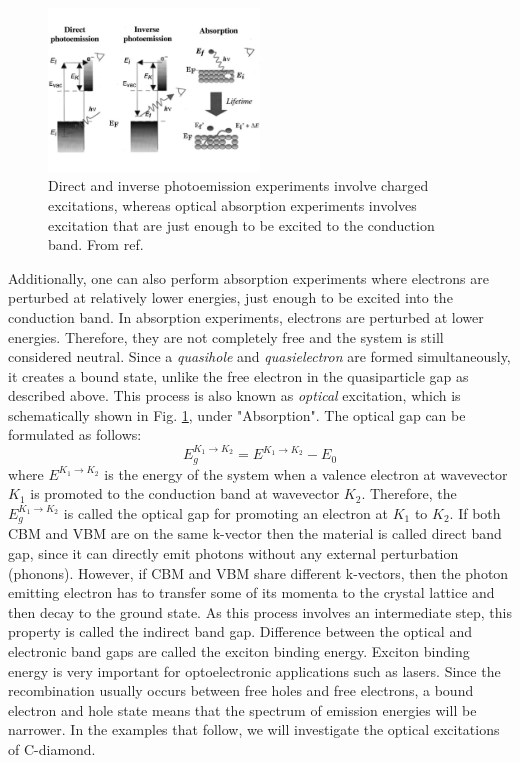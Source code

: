 \begin{figure}
	\centering
	\includegraphics[width=0.5\textwidth]{./figures/lab_excited_experiments}
	\caption{Direct and inverse photoemission experiments involve charged excitations, whereas optical absorption experiments involves excitation that are just enough to be excited to the conduction band. From ref. \cite{Onida2002a}}
	\label{fig:lab_ex_exp}
\end{figure}

Additionally, one can also perform absorption experiments where electrons are perturbed at relatively lower energies, just enough to be excited into the conduction band. 
In absorption experiments,  electrons are perturbed at lower energies. 
Therefore, they are not completely free and the system is still considered neutral. 
Since a \textit{quasihole} and \textit{quasielectron} are formed simultaneously, it creates a bound state, unlike the free electron in the quasiparticle gap as described above. 
This process is also known as \textit{optical} excitation, which is schematically shown in Fig. \ref{fig:lab_ex_exp}, under "Absorption". 
The optical gap can be formulated as follows:
\begin{equation}
E_g^{K_1 {\rightarrow} K_2}=E^{K_1 {\rightarrow} K_2}- E_{0}\label{eq:optical}
\end{equation}
where $E^{K_1 {\rightarrow} K_2}$ is the energy of the system when a valence electron at wavevector $K_1$ is promoted to the conduction band at wavevector $K_2$. 
Therefore, the $E_g^{K_1 {\rightarrow} K_2}$ is called the optical gap for promoting an electron at $K_1$ to $K_2$.
If both CBM and VBM are on the same k-vector then the material is called direct band gap, since it can directly emit photons without any external perturbation (phonons). 
However, if CBM and VBM share different k-vectors, then the photon emitting electron has to transfer some of its momenta to the crystal lattice and then decay to the ground state. 
As this process involves an intermediate step, this property is called the indirect band gap. 
Difference between the optical and electronic band gaps are called the exciton binding energy. 
Exciton binding energy is very important for optoelectronic applications such as lasers. 
Since the recombination usually occurs between free holes and free electrons, a bound electron and hole state means that the spectrum of emission energies will be narrower. 
In the examples that follow, we will investigate the optical excitations of C-diamond.

